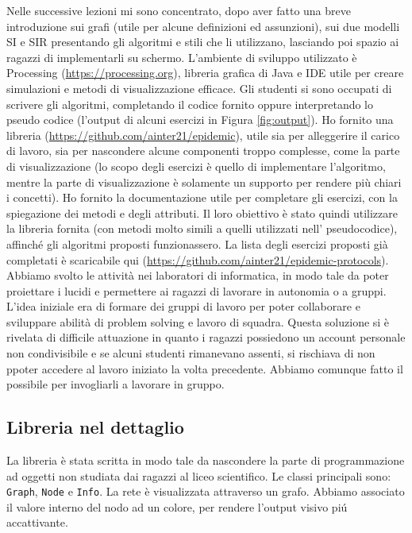 Nelle successive lezioni mi sono concentrato, dopo aver fatto una breve introduzione sui grafi (utile per alcune definizioni ed assunzioni), sui due modelli SI e SIR presentando gli algoritmi e stili che li utilizzano, lasciando poi spazio ai ragazzi di implementarli su schermo. L’ambiente di sviluppo utilizzato è Processing (\href{https://processing.org}{https://processing.org}), libreria grafica di Java e IDE utile per creare simulazioni e metodi di visualizzazione efficace. Gli studenti si sono occupati di scrivere gli algoritmi, completando il codice fornito oppure interpretando lo pseudo codice (l'output di alcuni esercizi in Figura \ref{fig:output}). Ho fornito una libreria (\href{https://github.com/ainter21/epidemic}{https://github.com/ainter21/epidemic}), utile sia per alleggerire il carico di lavoro, sia per nascondere alcune componenti troppo complesse, come la parte di visualizzazione (lo scopo degli esercizi è quello di implementare l’algoritmo, mentre la parte di visualizzazione è solamente un supporto per rendere più chiari i concetti).
Ho fornito la documentazione utile per completare gli esercizi, con la spiegazione dei metodi e degli attributi. Il loro obiettivo è stato quindi utilizzare la libreria fornita (con metodi molto simili a quelli utilizzati nell' pseudocodice), affinché gli algoritmi proposti funzionassero. La lista degli esercizi proposti già completati è scaricabile qui (\href{https://github.com/ainter21/epidemic-protocols}{https://github.com/ainter21/epidemic-protocols}).
Abbiamo svolto le attività nei laboratori di informatica, in modo tale da poter proiettare i lucidi e permettere ai ragazzi di lavorare in autonomia o a gruppi. L'idea iniziale era di formare dei gruppi di lavoro per poter collaborare e sviluppare abilità di problem solving e lavoro di squadra. Questa soluzione si è rivelata di difficile attuazione in quanto i ragazzi possiedono un account personale non condivisibile e se alcuni studenti rimanevano assenti, si rischiava di non ppoter accedere al lavoro iniziato la volta precedente. Abbiamo comunque fatto il possibile per invogliarli a lavorare in gruppo.

\subsection{Libreria nel dettaglio}
La libreria è stata scritta in modo tale da nascondere la parte di programmazione ad oggetti non studiata dai ragazzi al liceo scientifico. Le classi principali sono: \texttt{Graph}, \texttt{Node} e \texttt{Info}. La rete è visualizzata attraverso un grafo. Abbiamo associato il valore interno del nodo ad un colore, per rendere l'output visivo piú accattivante.

